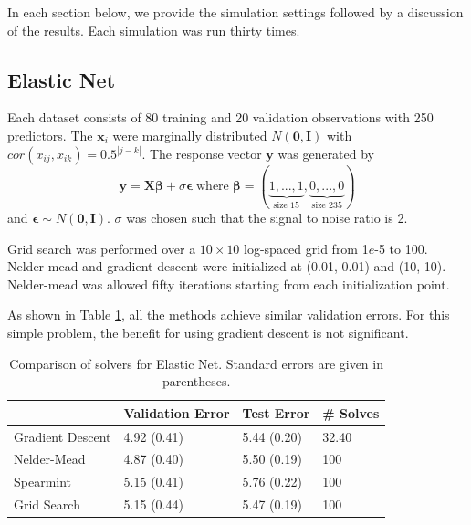 \documentclass[12pt]{article}
\begin{document}
In each section below, we provide the simulation settings followed by a discussion of the results. Each simulation was run thirty times. 

\subsection{Elastic Net}
Each dataset consists of 80 training and 20 validation observations with 250 predictors. The $\boldsymbol x_i$ were marginally distributed $N(\boldsymbol 0,\boldsymbol I)$ with $cor(x_{ij},x_{ik}) = 0.5^{|j-k|}$.
The response vector $\boldsymbol y$ was generated by
\begin{equation}
\boldsymbol y = \boldsymbol X \boldsymbol \beta + \sigma \boldsymbol \epsilon \; \text{where} \; \boldsymbol \beta = (\underbrace{1, ..., 1}_\text{size 15}, \underbrace{0, ..., 0}_\text{size 235})
\end{equation}
and $\boldsymbol \epsilon \sim N(\boldsymbol 0, \boldsymbol I)$. $\sigma$ was chosen such that the signal to noise ratio is 2. 

Grid search was performed over a $10 \times 10$ log-spaced grid from 1$e$-5 to 100. Nelder-mead and gradient descent were initialized at (0.01, 0.01) and (10, 10). Nelder-mead was allowed fifty iterations starting from each initialization point.

As shown in Table \ref{tab:elasticnet}, all the methods achieve similar validation errors. For this simple problem, the benefit for using gradient descent is not significant.

\begin{table}
\caption {\label{tab:elasticnet} Comparison of solvers for Elastic Net. Standard errors are given in parentheses.}
\centering
\begin{tabular}{| l | l | l | l | }
\hline
& Validation Error  & Test Error & \# Solves\\
\hline
Gradient Descent & 4.92 (0.41) & 5.44 (0.20) & 32.40 \\
\hline
Nelder-Mead & 4.87 (0.40) & 5.50 (0.19) & 100 \\
\hline
Spearmint & 5.15 (0.41) & 5.76 (0.22) & 100 \\
\hline
Grid Search & 5.15 (0.44) & 5.47 (0.19) & 100 \\
\hline
\end{tabular}
\end{table}
\end{document}
